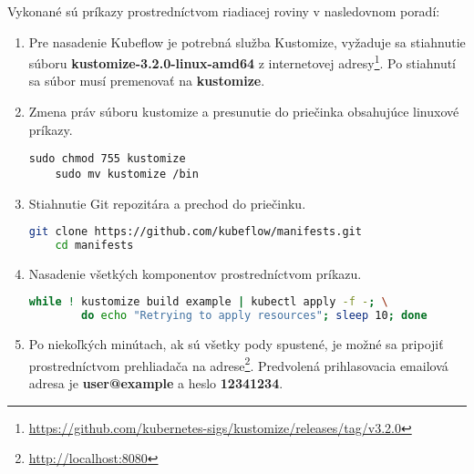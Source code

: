 Vykonané sú príkazy prostredníctvom riadiacej roviny v nasledovnom poradí:

\begin{enumerate}
\item{\noindent Pre nasadenie Kubeflow je potrebná služba Kustomize, vyžaduje sa stiahnutie súboru \textbf{kustomize-3.2.0-linux-amd64} z internetovej adresy\footnote{\url{https://github.com/kubernetes-sigs/kustomize/releases/tag/v3.2.0}}. Po stiahnutí sa súbor musí premenovať na \textbf{kustomize}}.
\item{\noindent Zmena práv súboru kustomize a presunutie do priečinka obsahujúce linuxové príkazy.
\begin{lstlisting}[basicstyle=\footnotesize]
    sudo chmod 755 kustomize
    sudo mv kustomize /bin
    \end{lstlisting}}
\item{\noindent Stiahnutie Git repozitára a prechod do priečinku.
\begin{lstlisting}[language=Bash,basicstyle=\footnotesize]
    git clone https://github.com/kubeflow/manifests.git
    cd manifests
    \end{lstlisting}}
\item{\noindent Nasadenie všetkých komponentov prostredníctvom príkazu.
\begin{lstlisting}[language=Bash,basicstyle=\footnotesize]
    while ! kustomize build example | kubectl apply -f -; \
        do echo "Retrying to apply resources"; sleep 10; done
    \end{lstlisting}}
\item{\noindent Po niekoľkých minútach, ak sú všetky pody spustené, je možné sa pripojiť prostredníctvom prehliadača na adrese\footnote{\url{http://localhost:8080}}. Predvolená prihlasovacia emailová adresa je \textbf{user@example} a heslo \textbf{12341234}.}
\end{enumerate}
